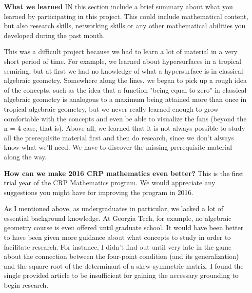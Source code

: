 \documentclass[12pt]{amsart}
\begin{document}
\begin{bibdiv}
\begin{biblist}




\end{biblist}
\end{bibdiv}

{\large \bf What we learned} 
IN this section include a brief summary about what you learned by participating in this project.  This could include mathematical content, but also research skills, networking skills or any other mathematical abilities you developed during the past month.

This was a difficult project because we had to learn a lot of material in a very short period of time. For example, we learned about hypersurfaces in a tropical semiring, but at first we had no knowledge of what a hypersurface is in classical algebraic geometry. Somewhere along the lines, we began to pick up a rough idea of the concepts, such as the idea that a function "being equal to zero" in classical algebraic geometry is analogous to a maximum being attained more than once in tropical algebraic geometry, but we never really learned enough to grow comfortable with the concepts and even be able to visualize the fans (beyond the n = 4 case, that is). Above all, we learned that it is not always possible to study all the prerequisite material first and then do research, since we don't always know what we'll need. We have to discover the missing prerequisite material along the way.

{\large \bf How can we make 2016 CRP mathematics even better?} 
This is the first trial year of the CRP Mathematics program.  We would appreciate any suggestions you might have for improving the program in 2016.

As I mentioned above, as undergraduates in particular, we lacked a lot of essential background knowledge. At Georgia Tech, for example, no algebraic geometry course is even offered until graduate school. It would have been better to have been given more guidance about what concepts to study in order to facilitate research. For instance, I didn't find out until very late in the game about the connection between the four-point condition (and its generalization) and the square root of the determinant of a skew-symmetric matrix. I found the single provided article to be insufficient for gaining the necessary grounding to begin research.
\end{document}
